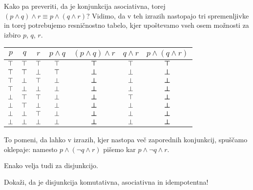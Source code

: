                 Kako pa preveriti, da je konjunkcija asociativna, torej $(p \land q) \land r \equiv p \land (q \land r)$? Vidimo, da v teh izrazih nastopajo tri spremenljivke in torej potrebujemo resničnostno tabelo, kjer upoštevamo vseh osem možnosti za izbiro $p$, $q$, $r$.

                \begin{center}
                        \begin{tabular}{ccc|cccc}
                                $p$ & $q$ & $r$ & $p \land q$ & $(p \land q) \land r$ & $q \land r$ & $p \land (q \land r)$ \\
                                \hline
                                $\top$ & $\top$ & $\top$ & $\top$ & $\boldsymbol{\top}$ & $\top$ & $\boldsymbol{\top}$ \\
                                $\top$ & $\top$ & $\bot$ & $\top$ & $\boldsymbol{\bot}$ & $\bot$ & $\boldsymbol{\bot}$ \\
                                $\top$ & $\bot$ & $\top$ & $\bot$ & $\boldsymbol{\bot}$ & $\bot$ & $\boldsymbol{\bot}$ \\
                                $\top$ & $\bot$ & $\bot$ & $\bot$ & $\boldsymbol{\bot}$ & $\bot$ & $\boldsymbol{\bot}$ \\
                                $\bot$ & $\top$ & $\top$ & $\bot$ & $\boldsymbol{\bot}$ & $\top$ & $\boldsymbol{\bot}$ \\
                                $\bot$ & $\top$ & $\bot$ & $\bot$ & $\boldsymbol{\bot}$ & $\bot$ & $\boldsymbol{\bot}$ \\
                                $\bot$ & $\bot$ & $\top$ & $\bot$ & $\boldsymbol{\bot}$ & $\bot$ & $\boldsymbol{\bot}$ \\
                                $\bot$ & $\bot$ & $\bot$ & $\bot$ & $\boldsymbol{\bot}$ & $\bot$ & $\boldsymbol{\bot}$
                        \end{tabular}
                \end{center}

                To pomeni, da lahko v izrazih, kjer nastopa več zaporednih konjunkcij, spuščamo oklepaje: namesto $p \land (\lnot{q} \land r)$ pišemo kar $p \land \lnot{q} \land r$.

                Enako velja tudi za disjunkcijo.

                \begin{naloga}
                        Dokaži, da je disjunkcija komutativna, asociativna in idempotentna!
                \end{naloga}

